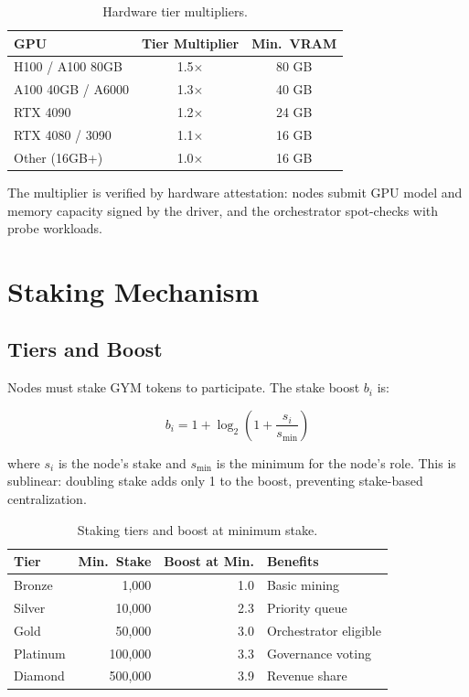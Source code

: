 \documentclass[11pt,letterpaper]{article}
\begin{document}
\begin{table}[t]
\centering
\begin{tabular}{lcc}
\toprule
\textbf{GPU} & \textbf{Tier Multiplier} & \textbf{Min.\ VRAM} \\
\midrule
H100 / A100 80GB & 1.5$\times$ & 80 GB \\
A100 40GB / A6000 & 1.3$\times$ & 40 GB \\
RTX 4090 & 1.2$\times$ & 24 GB \\
RTX 4080 / 3090 & 1.1$\times$ & 16 GB \\
Other (16GB+) & 1.0$\times$ & 16 GB \\
\bottomrule
\end{tabular}
\caption{Hardware tier multipliers.}
\label{tab:hardware}
\end{table}

The multiplier is verified by hardware attestation: nodes submit GPU model and memory capacity signed by the driver, and the orchestrator spot-checks with probe workloads.

\section{Staking Mechanism}
\label{sec:staking}

\subsection{Tiers and Boost}

Nodes must stake GYM tokens to participate.  The stake boost $b_i$ is:

\begin{equation}
    b_i = 1 + \log_2\!\left(1 + \frac{s_i}{s_{\min}}\right)
\end{equation}

where $s_i$ is the node's stake and $s_{\min}$ is the minimum for the node's role.  This is sublinear: doubling stake adds only 1 to the boost, preventing stake-based centralization.

\begin{table}[t]
\centering
\begin{tabular}{lrrl}
\toprule
\textbf{Tier} & \textbf{Min.\ Stake} & \textbf{Boost at Min.} & \textbf{Benefits} \\
\midrule
Bronze & 1{,}000 & 1.0 & Basic mining \\
Silver & 10{,}000 & 2.3 & Priority queue \\
Gold & 50{,}000 & 3.0 & Orchestrator eligible \\
Platinum & 100{,}000 & 3.3 & Governance voting \\
Diamond & 500{,}000 & 3.9 & Revenue share \\
\bottomrule
\end{tabular}
\caption{Staking tiers and boost at minimum stake.}
\label{tab:staking-tiers}
\end{table}
\end{document}
